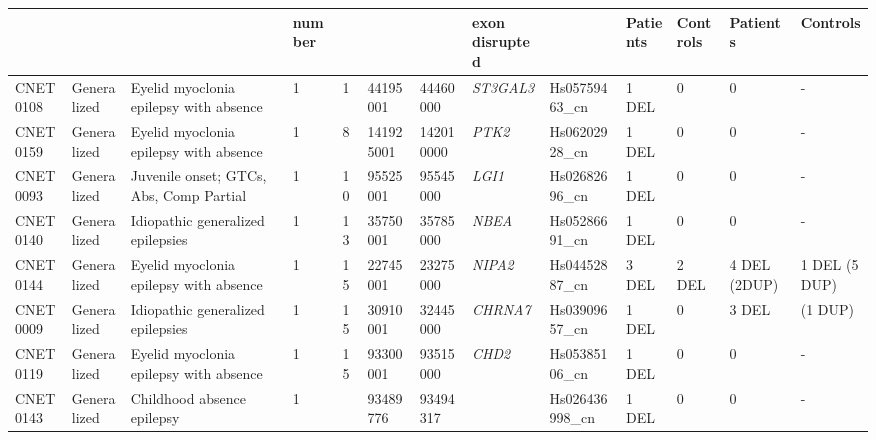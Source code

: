 \begin{table}[!ht]
{\begin{tabular}{|l|l|p{}|l|l|l|l|l|l|l|l|l|l|}
                                       &             &                                         & {\bf number} &                     &           &           & {\bf exon disrupted}  &                 & {\bf Patients  } & {\bf Controls } & {\bf Patients     } & {\bf Controls    } \\
      \hline
      CNET0108   & Generalized & Eyelid myoclonia epilepsy with absence  & 1            & 1                   & 44195001  & 44460000  & {\it ST3GAL3}               & Hs05759463\_cn  & 1 DEL            & 0               & 0                   & -                  \\
      \hline
      CNET0159 & Generalized & Eyelid myoclonia epilepsy with absence  & 1            & 8                   & 141925001 & 142010000 & {\it PTK2}                 & Hs06202928\_cn  & 1 DEL            & 0               & 0                   & -                  \\
      \hline
      CNET0093 & Generalized & Juvenile onset; GTCs, Abs, Comp Partial & 1            & 10                  & 95525001  & 95545000  & {\it LGI1}                 & Hs02682696\_cn  & 1 DEL            & 0               & 0                   & -                  \\
      \hline
      CNET0140 & Generalized & Idiopathic generalized epilepsies       & 1            & 13                  & 35750001  & 35785000  & {\it NBEA}                  & Hs05286691\_cn  & 1 DEL            & 0               & 0                   & -                  \\
      \hline
      CNET0144 & Generalized & Eyelid myoclonia epilepsy with absence  & 1            & 15                  & 22745001  & 23275000  & {\it NIPA2}                 & Hs04452887\_cn  & 3 DEL            & 2 DEL           & 4 DEL (2DUP)        & 1 DEL (5 DUP)      \\
      \hline
      CNET0009 & Generalized & Idiopathic generalized epilepsies       & 1            & 15                  & 30910001  & 32445000  & {\it CHRNA7}                & Hs03909657\_cn  & 1 DEL            & 0               & 3 DEL               & (1 DUP)            \\
      \hline
      CNET0119 & Generalized & Eyelid myoclonia epilepsy with absence  & 1            & \multirow{3}{*}{15} & 93300001  & 93515000  & \multirow{3}{*}{{\it CHD2}} & Hs05385106\_cn  & 1 DEL            & 0               & 0                   & -                  \\
      CNET0143 & Generalized & Childhood absence epilepsy              & 1            &                     & 93489776  & 93494317  &                       & Hs026436998\_cn & 1 DEL            & 0               & 0                   & -                  \\

\end{tabular}}
\end{table}
